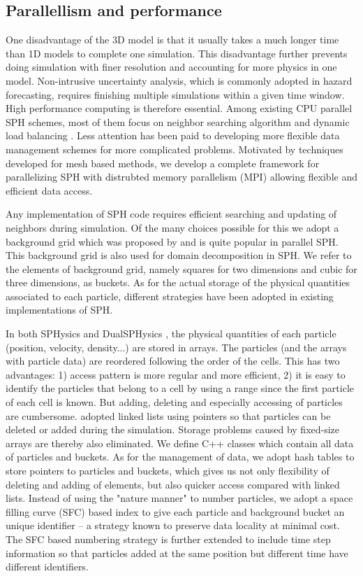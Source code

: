 \documentclass[journal abbreviation, manuscript]{copernicus}
\begin{document}
\subsection{Parallellism and performance}
One disadvantage of the 3D model is that it usually takes a much longer time than 1D models to complete one simulation. This disadvantage further prevents doing simulation with finer resolution and accounting for more physics in one model. Non-intrusive uncertainty analysis, which is commonly adopted in hazard forecasting, requires finishing multiple simulations within a given time window. High performance computing is therefore essential. Among existing CPU parallel SPH schemes, most of them focus on neighbor searching algorithm and dynamic load balancing \citep[eg. ][] {ferrari2009new, crespo2015dualsphysics}. Less attention has been paid to developing more flexible data management schemes for more complicated problems. Motivated by techniques developed for mesh based methods, we develop a complete framework for parallelizing SPH with distrubted memory parallelism (MPI) allowing flexible and efficient data access.

Any implementation of SPH code requires efficient searching and updating of neighbors during simulation. Of the many choices possible for this we adopt a background grid which was proposed by \citet {monaghan1985refined} and is quite popular in parallel SPH. This background grid is also used for domain decomposition in SPH. We refer to the elements of background grid, namely squares for two dimensions and cubic for three dimensions, as buckets. 
As for the actual storage of the physical quantities associated to each particle, different strategies have been adopted in existing implementations of SPH.

In both SPHysics and DualSPHysics \citep {crespo2015dualsphysics}, the physical quantities of each particle (position, velocity, density...) are stored in arrays. The particles (and the arrays with particle data) are reordered following the order of the cells. This has two advantages: 1) access pattern is more regular and more efficient, 2) it is easy to identify the particles that belong to a cell by using a range since the first particle of each cell is known. But adding, deleting and especially accessing of particles are cumbersome. \citet {ferrari2009new} adopted linked lists using pointers so that particles can be deleted or added during the simulation. Storage problems caused by fixed-size arrays are thereby also eliminated. We define C++ classes which contain all data of particles and buckets. As for the management of data, we adopt hash tables to store pointers to particles and buckets, which gives us not only flexibility of deleting and adding of elements, but also quicker access compared with linked lists. Instead of using the "nature manner" to number particles, we adopt a space filling curve (SFC) based index to give each particle and background bucket an unique identifier -- a strategy known to preserve data locality at minimal cost. The SFC based numbering strategy is further extended to include time step information so that particles added at the same position but different time have different identifiers. 
\end{document}
